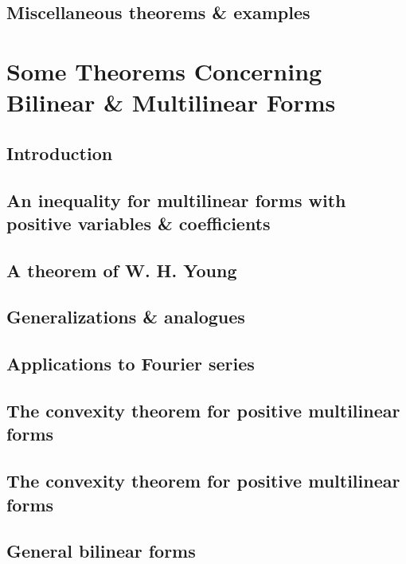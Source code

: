 \documentclass[oneside]{book}
\numberwithin{equation}{section}
\begin{document}
\subsection{Miscellaneous theorems \& examples}


\section{Some Theorems Concerning Bilinear \& Multilinear Forms}

\subsection{Introduction}

\subsection{An inequality for multilinear forms with positive variables \& coefficients}

\subsection{A theorem of W. H. Young}

\subsection{Generalizations \& analogues}

\subsection{Applications to Fourier series}

\subsection{The convexity theorem for positive multilinear forms}

\subsection{The convexity theorem for positive multilinear forms}

\subsection{General bilinear forms}
\end{document}
